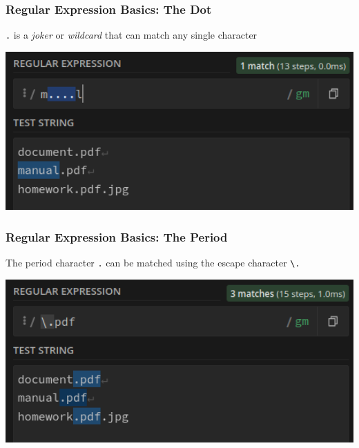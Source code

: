 \documentclass{beamer}
\begin{document}
\begin{frame}[fragile]
    \frametitle{Regular Expression Basics: The Dot}
    \begin{center}
        \texttt{\Large .} is a \textit{joker} or \textit{wildcard} that can match any single character
    \end{center}
    \begin{center}
    \includegraphics[width=1.0\textwidth]{pics/regex/regex2.png}
    \end{center}
\end{frame}

\begin{frame}[fragile]
    \frametitle{Regular Expression Basics: The Period}
    \begin{center}
        The period character \texttt{\Large .} can be matched using the escape character \texttt{\textbackslash .}
    \end{center}
    \begin{center}
    \includegraphics[width=1.0\textwidth]{pics/regex/regex3.png}
    \end{center}
\end{frame}
\end{document}

